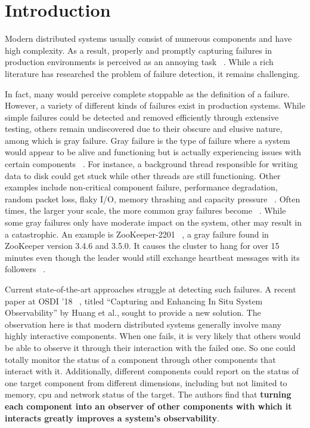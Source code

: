 \section{Introduction}
Modern distributed systems usually consist of numerous components and have high complexity. As a result, properly and promptly capturing failures in production environments is perceived as an annoying task ~\cite{dean2009designs, liu2007wids}. While a rich literature has researched the problem of failure detection, it remains challenging.

In fact, many would perceive complete stoppable as the definition of a failure. However, a variety of different kinds of failures exist in production systems. While simple failures could be detected and removed efficiently through extensive testing, others remain undiscovered due to their obscure and elusive nature, among which is gray failure. Gray failure is the type of failure where a system would appear to be alive and functioning but is actually experiencing issues with certain components ~\cite{huang2017gray}. For instance, a background thread responsible for writing data to disk could get stuck while other threads are still functioning. Other examples include non-critical component failure, performance degradation, random packet loss, flaky I/O, memory thrashing and capacity pressure ~\cite{huang2017gray}. Often times, the larger your scale, the more common gray failures become ~\cite{Grayfail28:online}. While some gray failures only have moderate impact on the system, other may result in a catastrophic. An example is ZooKeeper-2201 ~\cite{httpsiss99:online}, a gray failure found in ZooKeeper version 3.4.6 and 3.5.0. It causes the cluster to hang for over 15 minutes even though the leader would still exchange heartbeat messages with its followers ~\cite{beschastnikh2016debugging}. 

Current state-of-the-art approaches struggle at detecting such failures. A recent paper at OSDI '18 ~\cite{huang2018capturing}, titled ``Capturing and Enhancing In Situ System Observability'' by Huang et al., sought to provide a new solution. The observation here is that modern distributed systems generally involve many highly interactive components. When one fails, it is very likely that others would be able to observe it through their interaction with the failed one. So one could totally monitor the status of a component through other components that interact with it. Additionally, different components could report on the status of one target component from different dimensions, including but not limited to memory, cpu and network status of the target. The authors find that \textbf{turning each component into an observer of other components with which it interacts greatly improves a system's observability}. 

